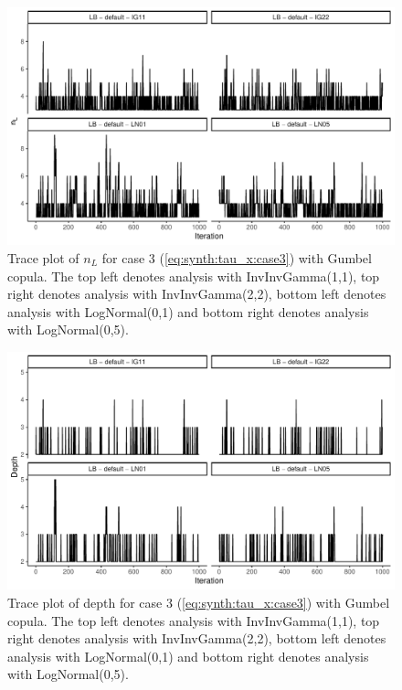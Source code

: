 \documentclass{amsart}
\begin{document}
\begin{figure}
	\centering
	\includegraphics[width = 0.75\linewidth]{trace_case3_gumbel_nterm.pdf}
	\caption{Trace plot of $n_L$ for case 3 (\cref{eq:synth:tau_x:case3}) with Gumbel copula. The top left denotes analysis with InvInvGamma(1,1), top right denotes analysis with InvInvGamma(2,2), bottom left denotes analysis with LogNormal(0,1) and bottom right denotes analysis with LogNormal(0,5).}
	\label{fig:case3:gumbel:nterm}
\end{figure}

\begin{figure}
	\centering
	\includegraphics[width = 0.75\linewidth]{trace_case3_gumbel_depth.pdf}
	\caption{Trace plot of depth for case 3 (\cref{eq:synth:tau_x:case3}) with Gumbel copula. The top left denotes analysis with InvInvGamma(1,1), top right denotes analysis with InvInvGamma(2,2), bottom left denotes analysis with LogNormal(0,1) and bottom right denotes analysis with LogNormal(0,5).}
	\label{fig:case3:gumbel:depth}
\end{figure}
\end{document}
